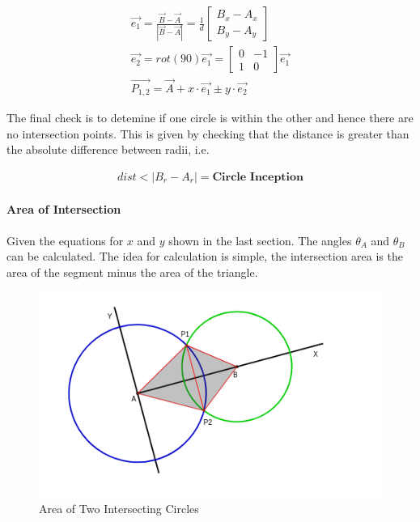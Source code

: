 \documentclass[11pt,twoside]{report}
\begin{document}
\begin{equation}
\begin{aligned}
 \overrightarrow{e_{1}} = \frac{ \overrightarrow{B}- \overrightarrow{A}}{|  \overrightarrow{B} -  \overrightarrow{A} |} 
= 
\frac{1}{d}
\begin{bmatrix}
B_{x} - A_{x} \\
B_{y} - A_{y}
\end{bmatrix} \\
\overrightarrow{e_{2}} =
rot(90) \overrightarrow{e_{1}} =
\begin{bmatrix}
0 & -1 \\
1 & 0
\end{bmatrix}
\overrightarrow{e_{1}} \\
\overrightarrow{P_{1,2}} = \overrightarrow{A}+x \cdot \overrightarrow{e_{1}} \pm y \cdot \overrightarrow{e_{2}}
\end{aligned}
\label{inter_point_eq3}
\end{equation}

The final check is to detemine if one circle is within the other and hence there are no intersection points. This is given by checking that the distance is greater than the absolute difference between radii, i.e.


\begin{equation}
\begin{aligned}
dist < |B_{r} - A_{r}| = \textbf{Circle Inception}
\end{aligned}
\label{circle_inception}
\end{equation}


\paragraph{Area of Intersection}

Given the equations for $x$ and $y$ shown in the last section. The angles $\theta_{A}$ and $\theta_{B}$ can be calculated. The idea for calculation is simple, the intersection area is the area of the segment minus the area of the triangle.

\noindent \begin{figure}[h!]
	\includegraphics[width = 1.0\hsize]{figures/two_intersecting_circles.png}
	\caption{Area of Two Intersecting Circles \cite{circle_intersection}}
	\label{two_intersect_circles}
\end{figure}
\end{document}
